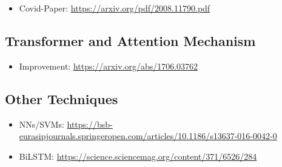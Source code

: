 \begin{itemize}
	\item Covid-Paper: \url{https://arxiv.org/pdf/2008.11790.pdf}
\end{itemize}


\subsection{Transformer and Attention Mechanism} \label{fundamentalsG}

\begin{itemize}
	\item Improvement: \url{https://arxiv.org/abs/1706.03762}
\end{itemize}


\subsection{Other Techniques} \label{fundamentalsH}

\begin{itemize}
	\item NNs/SVMs: \url{https://bsb-eurasipjournals.springeropen.com/articles/10.1186/s13637-016-0042-0}
	\item BiLSTM: \url{https://science.sciencemag.org/content/371/6526/284}
\end{itemize}


\newpage
